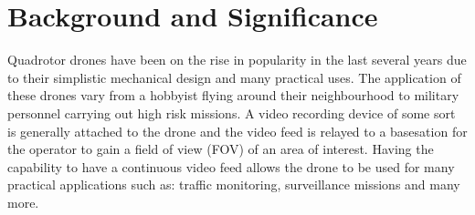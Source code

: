 \section{Background and Significance}
Quadrotor drones have been on the rise in popularity in the last several years due to their simplistic mechanical design and many practical uses. The application of these drones vary from a hobbyist flying around their neighbourhood to military personnel carrying out high risk missions. A video recording device of some sort is generally attached to the drone and the video feed is relayed to a basesation for the operator to gain a field of view (FOV) of an area of interest. Having the capability to have a continuous video feed allows the drone to be used for many practical applications such as: traffic monitoring, surveillance missions and many more. 